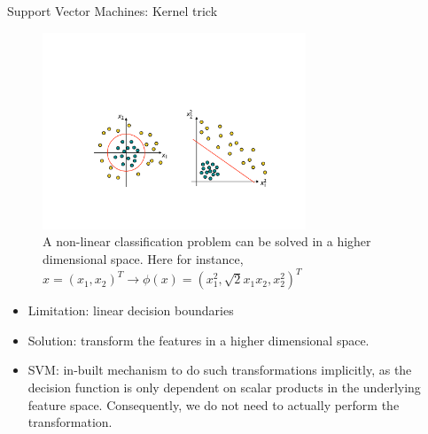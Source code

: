 \documentclass[xcolor=pdftex,dvipsnames,table]{beamer}
\begin{document}

\begin{frame}{Support Vector Machines: Kernel trick}
	\begin{figure}[htb]
		\includegraphics[width=0.7\textwidth]{../graphics/KernelTrick.pdf}
		\caption{A non-linear classification problem can be solved in a higher dimensional space. Here for instance, $x = (x_1, x_2)^T \rightarrow \phi(x) = (x_1^2, \sqrt{2}x_1x_2, x_2^2)^T$}
	\end{figure}
	\begin{itemize}
		\item Limitation: linear decision boundaries
		\item Solution: transform the features in a higher dimensional space.
		\item SVM: in-built mechanism to do such transformations implicitly, as the decision function is only dependent on scalar products in the underlying feature space. Consequently, we do not need to actually perform the transformation.
	\end{itemize}
\end{frame}
\end{document}
